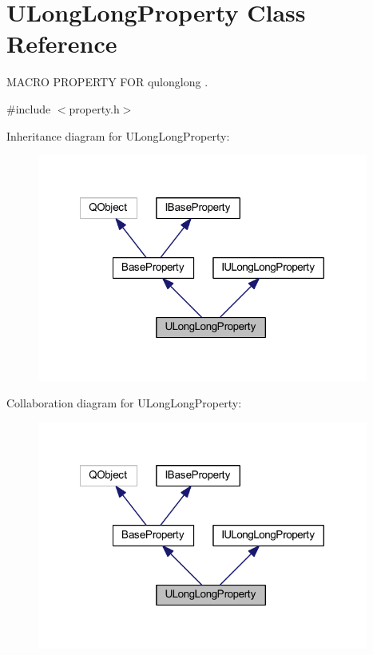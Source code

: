 \hypertarget{class_u_long_long_property}{\section{U\-Long\-Long\-Property Class Reference}
\label{class_u_long_long_property}
}


M\-A\-C\-R\-O P\-R\-O\-P\-E\-R\-T\-Y F\-O\-R qulonglong .  




{\ttfamily \#include $<$property.\-h$>$}



Inheritance diagram for U\-Long\-Long\-Property\-:
\nopagebreak
\begin{figure}[H]
\begin{center}
\leavevmode
\includegraphics[width=308pt]{class_u_long_long_property__inherit__graph}
\end{center}
\end{figure}


Collaboration diagram for U\-Long\-Long\-Property\-:
\nopagebreak
\begin{figure}[H]
\begin{center}
\leavevmode
\includegraphics[width=308pt]{class_u_long_long_property__coll__graph}
\end{center}
\end{figure}

